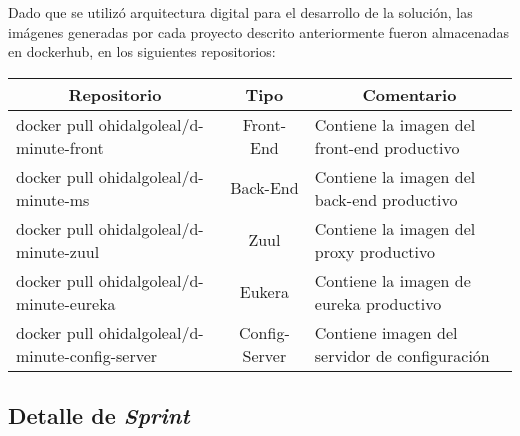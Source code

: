 Dado que se utilizó arquitectura digital para el desarrollo de la solución, las imágenes generadas por cada proyecto descrito anteriormente fueron almacenadas en dockerhub, en los siguientes repositorios:


\begin{table}[!h]
\centering
\resizebox{15cm}{!} {
\begin{tabular}{|l|c|l|}
\hline
\multicolumn{1}{|c|}{\textbf{Repositorio}} & \textbf{Tipo} & \multicolumn{1}{c|}{\textbf{Comentario}} \\ \hline
docker pull ohidalgoleal/d-minute-front & Front-End & Contiene la imagen del front-end productivo \\ \hline
docker pull ohidalgoleal/d-minute-ms & Back-End & Contiene la imagen del back-end productivo \\ \hline
docker pull ohidalgoleal/d-minute-zuul & Zuul & Contiene la imagen del proxy productivo \\ \hline
docker pull ohidalgoleal/d-minute-eureka & Eukera & Contiene la imagen de eureka productivo \\ \hline
docker pull ohidalgoleal/d-minute-config-server & Config-Server & Contiene imagen del servidor de configuración \\ \hline
\end{tabular}
}
\end{table} 

\subsection{Detalle de \textit{Sprint}}

